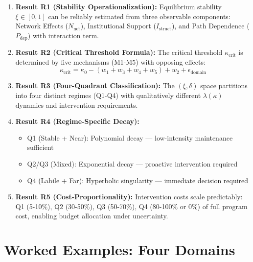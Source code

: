 \documentclass[11pt, a4paper]{article}
\begin{document}
\begin{enumerate}
    \item \textbf{Result R1 (Stability Operationalization):}
    Equilibrium stability $\xi \in [0,1]$ can be reliably estimated from three observable
    components: Network Effects ($N_{\text{net}}$), Institutional Support ($I_{\text{struct}}$),
    and Path Dependence ($P_{\text{dep}}$) with interaction term.

    \item \textbf{Result R2 (Critical Threshold Formula):}
    The critical threshold $\kappa_{\text{crit}}$ is determined by five mechanisms (M1-M5)
    with opposing effects:
    \begin{equation}
    \kappa_{\text{crit}} = \kappa_0 - (w_1 + w_3 + w_4 + w_5) + w_2 + \epsilon_{\text{domain}}
    \end{equation}

    \item \textbf{Result R3 (Four-Quadrant Classification):}
    The $(\xi, \delta)$ space partitions into four distinct regimes (Q1-Q4) with
    qualitatively different $\lambda(\kappa)$ dynamics and intervention requirements.

    \item \textbf{Result R4 (Regime-Specific Decay):}
    \begin{itemize}[nosep]
        \item Q1 (Stable + Near): Polynomial decay --- low-intensity maintenance sufficient
        \item Q2/Q3 (Mixed): Exponential decay --- proactive intervention required
        \item Q4 (Labile + Far): Hyperbolic singularity --- immediate decision required
    \end{itemize}

    \item \textbf{Result R5 (Cost-Proportionality):}
    Intervention costs scale predictably: Q1 (5-10\%), Q2 (30-50\%), Q3 (50-70\%), Q4 (80-100\% or 0\%)
    of full program cost, enabling budget allocation under uncertainty.
\end{enumerate}


\section{Worked Examples: Four Domains}
\end{document}
